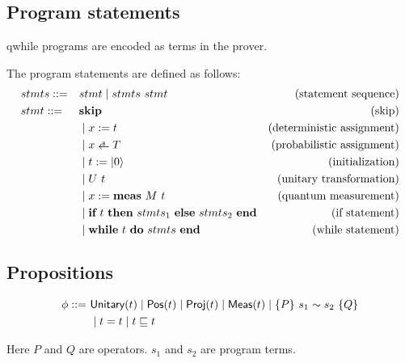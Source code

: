 \subsection{Program statements}
qwhile programs are encoded as terms in the prover.

\newcommand{\rndarrow}{%
  \stackrel{\raisebox{-.25ex}[.25ex]%
   {\tiny $\mathdollar$}}{\raisebox{-.25ex}[.25ex]{$\leftarrow$}}}

\newcommand{\Skip}{\textbf{skip}}
\newcommand{\Assign}[2]{\ensuremath{#1:=#2}}
\newcommand{\pAssign}[2]{\ensuremath{#1 \rndarrow #2}}
\newcommand{\Init}[1]{\ensuremath{#1:=\ket{0}}}
\newcommand{\MeaAssign}[3]{\ensuremath{#1 := \textbf{meas}\ #2\ #3}}
\newcommand{\If}[3]{\ensuremath{
    \textbf{if}\ #1\ \textbf{then}\ #2\ \textbf{else}\ #3\ \textbf{end}
}}
\newcommand{\While}[2]{\ensuremath{
    \textbf{while}\ #1\ \textbf{do}\ #2\ \textbf{end}
}}

\begin{definition}
    \label{def: prog syntax}
    The program statements are defined as follows:
    \begin{align*}
        & stmts ::= && stmt \mid stmts\ stmt & \text{(statement sequence)} \\
        & stmt ::= && \Skip & \text{(skip)} \\
            & && \mid \Assign{x}{t} & \text{(deterministic assignment)} \\
            & && \mid \pAssign{x}{T} & \text{(probabilistic assignment)} \\
            & && \mid \Init{t} & \text{(initialization)} \\
            & && \mid U\ t & \text{(unitary transformation)} \\
            & && \mid \MeaAssign{x}{M}{t} & \text{(quantum measurement)} \\
            & && \mid \If{t}{stmts_1}{stmts_2} & \text{(if statement)} \\
            & && \mid \While{t}{stmts} & \text{(while statement)}
    \end{align*}
\end{definition}

\subsection{Propositions}

\begin{definition}
    \label{def:prop syntax}
    \begin{align*}
        \phi ::=\ & \textsf{Unitary}({t}) \mid \textsf{Pos}({t}) \mid \textsf{Proj}({t}) \mid \textsf{Meas}(t) \mid \{P\}~s_1 \sim s_2~\{Q\} \\
                & \mid t = t \mid t \sqsubseteq t
    \end{align*}
\end{definition}
Here $P$ and $Q$ are operators. $s_1$ and $s_2$ are program terms.

